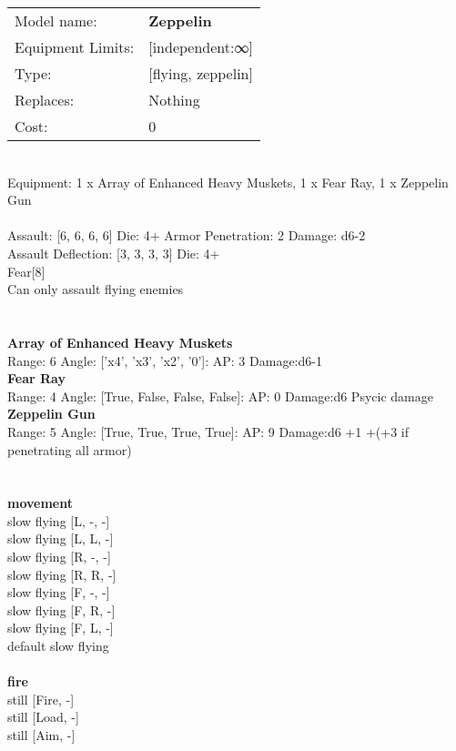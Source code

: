 \noindent
\begin{tabular}{ll}
Model name: &{\bf Zeppelin } \\
Equipment Limits: &[independent:∞] \\
Type: &[flying, zeppelin] \\
Replaces: &Nothing \\
Cost: & 0\\
\end{tabular}
\ \\
Equipment: 1 x Array of Enhanced Heavy Muskets, 1 x Fear Ray, 1 x Zeppelin Gun \\
\ \\
Assault: [6, 6, 6, 6] Die: 4+ Armor Penetration: 2 Damage: d6-2 \\
Assault Deflection: [3, 3, 3, 3] Die: 4+\\
\indent Fear[8]\\ 
Can only assault flying enemies\\ 
 
\ \\

\ \\
{\bf Array of Enhanced Heavy Muskets } \\



Range: 6  Angle: ['x4', 'x3', 'x2', '0']: AP: 3 Damage:d6-1 \\




{\bf Fear Ray } \\



Range: 4  Angle: [True, False, False, False]: AP: 0 Damage:d6 Psycic damage \\




{\bf Zeppelin Gun } \\



Range: 5  Angle: [True, True, True, True]: AP: 9 Damage:d6 +1 +(+3 if penetrating all armor) \\




 
\ \\



\ \\ {\bf movement } \\
slow flying [L, -, -] \\
slow flying [L, L, -] \\
slow flying [R, -, -] \\
slow flying [R, R, -] \\
slow flying [F, -, -] \\
slow flying [F, R, -] \\
slow flying [F, L, -] \\
default slow flying \\
\ \\ {\bf fire } \\
still [Fire, -] \\
still [Load, -] \\
still [Aim, -] \\


